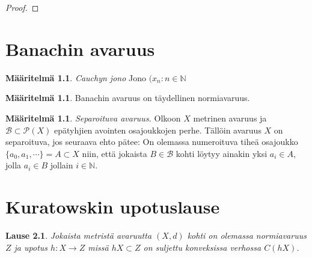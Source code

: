 \documentclass[12pt,a4paper,leqno]{report}
\newcommand{\N}{\mathbb{N}}
\theoremstyle{plain}
\newtheorem{lause}[equation]{Lause}
\theoremstyle{definition}
\newtheorem{maar}[equation]{Määritelmä}
\theoremstyle{remark}
\begin{document}
\begin{proof}

\end{proof}

\chapter{Banachin avaruus}\label{Banach}

\begin{maar}\emph{Cauchyn jono} 
Jono $(x_n\colon n\in \N$

\end{maar}

\begin{maar}Banachin avaruus on täydellinen normiavaruus.
\end{maar}

\begin{maar}\emph{Separoituva avaruus.} Olkoon $X$ metrinen avaruus ja $\mathcal{B}\subset \mathcal{P}( X)$ epätyhjien avointen osajoukkojen perhe. Tällöin avaruus $X$ on separoituva, jos seuraava ehto pätee: On olemassa numeroituva tiheä osajoukko $\{a_0,a_1,\cdots\}=A\subset X$ niin, että jokaista $B\in\mathcal{B}$ kohti löytyy ainakin yksi $a_i\in A$, jolla $a_i\in B$ jollain $i\in \N$.
\end{maar}


\chapter{Kuratowskin upotuslause}\label{kuratowski}

\begin{lause}
Jokaista metristä avaruutta $(X,d)$ kohti on olemassa normiavaruus $Z$ ja upotus $h\colon X\rightarrow Z$ missä $ hX\subset Z$ on suljettu konveksissa verhossa $C(hX)$. 
\end{lause} 
 
\end{document}
